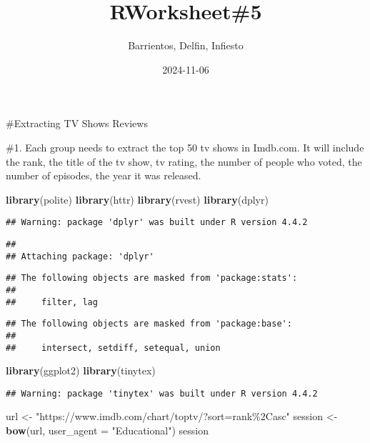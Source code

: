 \documentclass[
]{article}
\title{RWorksheet\#5}
\author{Barrientos, Delfin, Infiesto}
\date{2024-11-06}
\newenvironment{Shaded}{\begin{snugshade}}{\end{snugshade}}
\newcommand{\AttributeTok}[1]{\textcolor[rgb]{0.13,0.29,0.53}{#1}}
\newcommand{\FunctionTok}[1]{\textcolor[rgb]{0.13,0.29,0.53}{\textbf{#1}}}
\newcommand{\NormalTok}[1]{#1}
\newcommand{\OtherTok}[1]{\textcolor[rgb]{0.56,0.35,0.01}{#1}}
\newcommand{\StringTok}[1]{\textcolor[rgb]{0.31,0.60,0.02}{#1}}
\begin{document}
\maketitle

\#Extracting TV Shows Reviews

\#1. Each group needs to extract the top 50 tv shows in Imdb.com. It
will include the rank, the title of the tv show, tv rating, the number
of people who voted, the number of episodes, the year it was released.

\begin{Shaded}
\begin{Highlighting}[]
\FunctionTok{library}\NormalTok{(polite)}
\FunctionTok{library}\NormalTok{(httr)}
\FunctionTok{library}\NormalTok{(rvest)}
\FunctionTok{library}\NormalTok{(dplyr)}
\end{Highlighting}
\end{Shaded}

\begin{verbatim}
## Warning: package 'dplyr' was built under R version 4.4.2
\end{verbatim}

\begin{verbatim}
## 
## Attaching package: 'dplyr'
\end{verbatim}

\begin{verbatim}
## The following objects are masked from 'package:stats':
## 
##     filter, lag
\end{verbatim}

\begin{verbatim}
## The following objects are masked from 'package:base':
## 
##     intersect, setdiff, setequal, union
\end{verbatim}

\begin{Shaded}
\begin{Highlighting}[]
\FunctionTok{library}\NormalTok{(ggplot2)}
\FunctionTok{library}\NormalTok{(tinytex)}
\end{Highlighting}
\end{Shaded}

\begin{verbatim}
## Warning: package 'tinytex' was built under R version 4.4.2
\end{verbatim}

\begin{Shaded}
\begin{Highlighting}[]
\NormalTok{url }\OtherTok{\textless{}{-}} \StringTok{"https://www.imdb.com/chart/toptv/?sort=rank\%2Casc"}
\NormalTok{session }\OtherTok{\textless{}{-}} \FunctionTok{bow}\NormalTok{(url, }\AttributeTok{user\_agent =} \StringTok{"Educational"}\NormalTok{)}
\NormalTok{session}
\end{Highlighting}
\end{Shaded}
\end{document}
